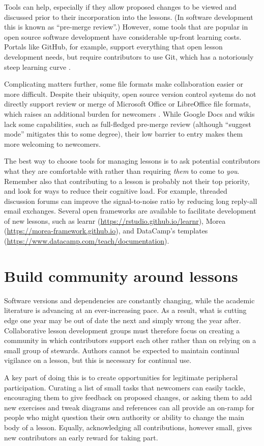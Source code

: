 \documentclass[10pt,letterpaper]{article}
\newcommand{\rulemajor}[2]{\section{#1}\label{#2}}
\begin{document}
Tools can help,
especially if they allow proposed changes to be viewed and discussed
prior to their incorporation into the lessons.
(In software development this is known as ``pre-merge review''.)
However,
some tools that are popular in open source software development have considerable up-front learning costs.
Portals like GitHub,
for example,
support everything that open lesson development needs,
but require contributors to use Git,
which has a notoriously steep learning curve \cite{git-survey}.

Complicating matters further,
some file formats make collaboration easier or more difficult.
Despite their ubiquity,
open source version control systems do not directly support review or merge
of Microsoft Office or LibreOffice file formats,
which raises an additional burden for newcomers \cite{jacobs}.
While Google Docs and wikis lack some capabilities, such as
full-fledged pre-merge review (although ``suggest mode'' 
mitigates this to some degree), 
their low barrier to entry makes them more welcoming to newcomers.

The best way to choose tools for managing lessons is
to ask potential contributors what they are comfortable with
rather than requiring \emph{them} to come to \emph{you}.
Remember also that contributing to a lesson is probably not their top priority,
and look for ways to reduce their cognitive load.
For example,
threaded discussion forums can improve the signal-to-noise ratio
by reducing long reply-all email exchanges.
Several open frameworks are available to facilitate development of new lessons,
such as learnr (\url{https://rstudio.github.io/learnr}),
Morea (\url{https://morea-framework.github.io}),
and DataCamp's templates (\url{https://www.datacamp.com/teach/documentation}).

\rulemajor{Build community around lessons}{community}

Software versions and dependencies are constantly changing,
while the academic literature is advancing at an ever-increasing pace.
As a result,
what is cutting edge one year may be out of date the next and simply wrong the year after.
Collaborative lesson development groups must therefore focus
on creating a community in which contributors support each other
rather than on relying on a small group of stewards.
Authors cannot be expected to maintain continual vigilance on a lesson,
but this is necessary for continual use.

A key part of doing this is to create opportunities for legitimate peripheral participation.
Curating a list of small tasks that newcomers can easily tackle,
encouraging them to give feedback on proposed changes,
or asking them to add new exercises and tweak diagrams and references
can all provide an on-ramp for people who might question their own authority or ability to change the main body of a lesson.
Equally,
acknowledging all contributions,
however small,
gives new contributors an early reward for taking part. 
\end{document}

